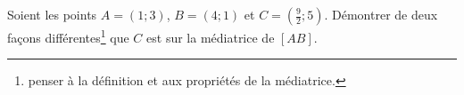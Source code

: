 
\begin{exercice}\label{exoSeconde-0010}

    Soient les points \( A=(1;3)\), \( B=(4;1)\) et \( C=(\frac{ 9 }{ 2 };5)\). Démontrer de deux façons différentes\footnote{penser à la définition et aux propriétés de la médiatrice.} que \( C\) est sur la médiatrice de \( [AB]\).

\end{exercice}
